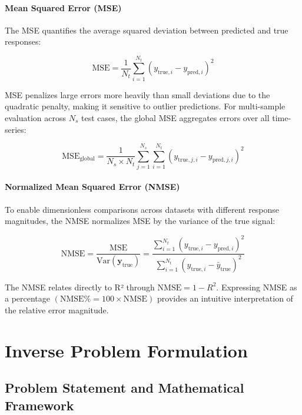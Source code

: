 \documentclass[12pt,a4paper]{report}
\begin{document}
\paragraph{Mean Squared Error (MSE)} The MSE quantifies the average squared deviation between predicted and true responses:

\begin{equation}
\text{MSE} = \frac{1}{N_t} \sum_{i=1}^{N_t} (y_{\text{true},i} - y_{\text{pred},i})^2
\end{equation}

MSE penalizes large errors more heavily than small deviations due to the quadratic penalty, making it sensitive to outlier predictions. For multi-sample evaluation across $N_s$ test cases, the global MSE aggregates errors over all time-series:

\begin{equation}
\text{MSE}_{\text{global}} = \frac{1}{N_s \times N_t} \sum_{j=1}^{N_s} \sum_{i=1}^{N_t} (y_{\text{true},j,i} - y_{\text{pred},j,i})^2
\end{equation}



\paragraph{Normalized Mean Squared Error (NMSE)} To enable dimensionless comparisons across datasets with different response magnitudes, the NMSE normalizes MSE by the variance of the true signal:

\begin{equation}
\text{NMSE} = \frac{\text{MSE}}{\text{Var}(\mathbf{y}_{\text{true}})} = \frac{\sum_{i=1}^{N_t} (y_{\text{true},i} - y_{\text{pred},i})^2}{\sum_{i=1}^{N_t} (y_{\text{true},i} - \bar{y}_{\text{true}})^2}
\end{equation}

The NMSE relates directly to R² through $\text{NMSE} = 1 - R^2$. Expressing NMSE as a percentage $(\text{NMSE}\% = 100 \times \text{NMSE})$ provides an intuitive interpretation of the relative error magnitude.


\section{Inverse Problem Formulation}
\label{sec:inverse_problem}

\subsection{Problem Statement and Mathematical Framework}
\end{document}
